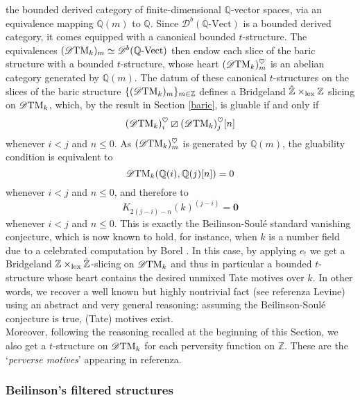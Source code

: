 \documentclass{article}
\theoremstyle{definition}
\newcommand{\Z}{\mathbb{Z}}
\newcommand{\orth}{\boxslash}
\newcommand{\lex}{\times_{\textnormal{lex}}}
\begin{document}
 the bounded derived category  of finite-dimensional $\mathbb{Q}$-vector spaces, via an equivalence mapping $\mathbb{Q}(m)$ to $\mathbb{Q}$. %
   Since $\mathscr{D}^b(\mathbb{Q}\text{-Vect})$ is a bounded derived category, it comes equipped with a canonical bounded $t$-structure. The equivalences $(\mathscr{D}\textnormal{TM}_k)_{m}\simeq \mathscr{D}^b(\mathbb{Q}\text{-Vect})$ then endow each slice of the baric structure with a bounded $t$-structure, whose heart $(\mathscr{D}\textnormal{TM}_k)_{m}^\heartsuit$ is an abelian category generated by $\mathbb{Q}(m)$. The datum of these canonical $t$-structures on the slices of the baric structure  $\{(\mathscr{D}\textnormal{TM}_k)_{m}\}_{m\in \mathbb{Z}}$ defines a Bridgeland $\hat{\Z}\lex \Z$ slicing on $\mathscr{D}\textnormal{TM}_k$, which, by the result in Section \ref{baric}, is gluable if and only if  
\[
(\mathscr{D}\textnormal{TM}_k)_{i}^\heartsuit\orth(\mathscr{D}\textnormal{TM}_k)_{j}^\heartsuit[n]
\]
 whenever $i<j$ and $n\leq 0$. As $(\mathscr{D}\textnormal{TM}_k)_{m}^\heartsuit$ is generated by $\mathbb{Q}(m)$, the gluability condition is equivalent to
 \[
   \mathscr{D}\textnormal{TM}_k(\mathbb{Q}(i),\mathbb{Q}(j)[n])=0
    \]
 whenever $i<j$ and $n\leq 0$, and therefore to    
\[
K_{2(j-i)-n}(k)^{(j-i)} = \mathbf{0}
\]  whenever  $i < j$ and $n \leq 0$. This is exactly the Beilinson-Soul\'e standard vanishing conjecture, which is now known to hold, for instance, when $k$ is a number field due to a celebrated computation by Borel \cite{??}. In this case, by applying $e_!$ we get a Bridgeland $\Z \lex \hat{\Z}$-slicing on $\mathscr{D}\textnormal{TM}_k$ and thus in particular a bounded $t$-structure whose heart contains the desired unmixed Tate motives over $k$. In other words, we recover a well known but highly nontrivial fact (see {\color{red} referenza Levine}) using an abstract and very general reasoning: assuming the Beilinson-Soul\'e conjecture is true, (Tate) motives exist. \\
   Moreover, following the reasoning recalled at the beginning of this Section, we also get a $t$-structure on $\mathscr{D}\textnormal{TM}_k$ for each perversity function on $\mathbb{Z}$. These are the `\textit{perverse motives}' appearing in {\color{red} referenza}. 

\subsubsection{Beilinson's filtered structures}
\end{document}
